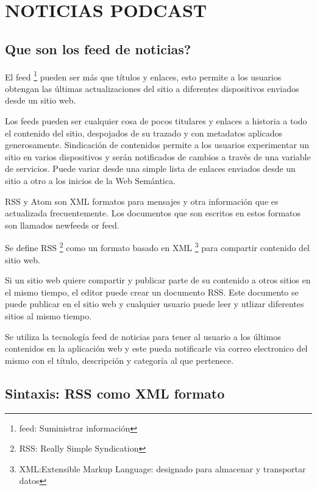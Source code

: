 \chapter{NOTICIAS PODCAST}

\section{\textquestiondown Que son los feed de noticias?}

El feed \footnote{feed: Suministrar informaci\'{o}n} pueden ser m\'{a}s que t\'{i}tulos y enlaces, esto permite a los usuarios 
obtengan las \'{u}ltimas actualizaciones del sitio a diferentes dispositivos enviados desde un sitio web.

Los feeds pueden ser cualquier cosa de pocos titulares y enlaces a historia a todo el contenido del sitio, despojados
de su trazado y con metadatos aplicados generosamente. Sindicaci\'{o}n de contenidos permite a los usuarios experimentar
un sitio en varios dispositivos y ser\'{a}n notificados de cambios a trav\'{e}s de una variable de servicios. Puede 
variar desde una simple lista de enlaces enviados desde un sitio a otro a los inicios de la Web Sem\'{a}ntica.\cite{hammersley2005developing}

RSS y Atom son XML formatos para mensajes y otra informaci\'{o}n que es actualizada frecuentemente.
Los documentos que son escritos en estos formatos son llamados newfeeds or feed.\cite{wittenbrink2005rss}

Se define RSS \footnote{RSS: Really Simple Syndication} como un formato basado en XML \footnote{XML:Extensible Markup Language: designado para almacenar y transportar datos} para compartir contenido del sitio web.

Si un sitio web quiere compartir y publicar parte de su contenido a otros sitios en el mismo tiempo, el editor puede crear un
documento RSS. Este documento se puede publicar en el sitio web y cualquier usuario puede leer y utlizar diferentes sitios al mismo
tiempo. \cite{zeki2004rss}

Se utiliza la tecnolog\'{i}a feed de noticias para tener al usuario a los \'{u}ltimos contenidos en la aplicaci\'{o}n web
y este pueda notificarle via correo electronico del mismo con el t\'{i}tulo, descripci\'{o}n y categor\'{i}a al que pertenece.

\section{Sintaxis: RSS como XML formato}

